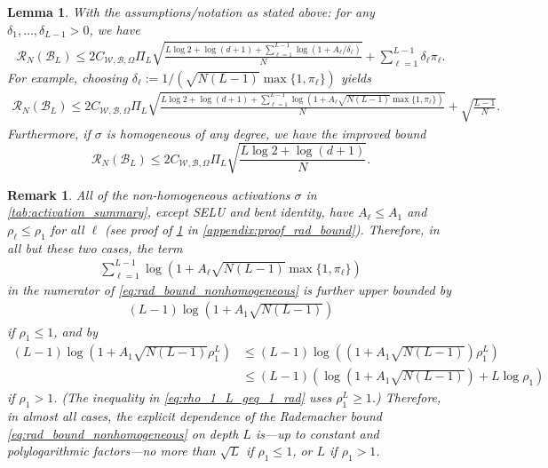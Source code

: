 \documentclass{article}
\def\cB{{\mathcal{B}}}
\def\cR{{\mathcal{R}}}
\def\cW{{\mathcal{W}}}
\newtheorem{lemma}[theorem]{Lemma}
\newtheorem{remark}[theorem]{Remark}
\begin{document}
\begin{lemma} \label{lemma:rad_bound}
    With the assumptions/notation as stated above: for any $\delta_1, \dots, \delta_{L-1} > 0$, we have
    \begin{align} \label{eq:rad_bound_nonhomogeneous_delta}
        \cR_N(\cB_L) \leq 2 C_{\cW, \cB,\Omega} \Pi_L \sqrt{\frac{L \log 2 + \log(d+1) + \sum_{\ell=1}^{L-1} \log (1+A_\ell/\delta_\ell)}{N}} + \sum_{\ell=1}^{L-1} \delta_{\ell} \pi_\ell.
    \end{align}
    For example, choosing $\delta_\ell := 1/(\sqrt{N(L-1)} \max\{1,\pi_\ell\})$ yields 
    \begin{align} \label{eq:rad_bound_nonhomogeneous}
        \cR_N(\cB_L) \leq 2 C_{\cW, \cB,\Omega} \Pi_L \sqrt{\frac{L \log 2 + \log(d+1) + \sum_{\ell=1}^{L-1} \log (1+ A_\ell \sqrt{N(L-1)} \max\{1, \pi_\ell\} )}{N}} + \sqrt{\frac{L-1}{N}}.
    \end{align}
    Furthermore, if $\sigma$ is homogeneous of any degree, we have the improved bound
    \begin{equation} \label{eq:rad_bound_homogeneous}
        \cR_N(\cB_L) \leq 2 C_{\cW, \cB, \Omega} \Pi_L \sqrt{\frac{L \log 2 + \log(d+1)}{N}}.
    \end{equation}
\end{lemma}
\begin{remark} \label{remark:rad_bound_A_rho}
    All of the non-homogeneous activations $\sigma$ in \cref{tab:activation_summary}, except SELU and bent identity, have $A_\ell \leq A_1$ and $\rho_\ell \leq \rho_1$ for all $\ell$ (see proof of \cref{lemma:rad_bound} in \cref{appendix:proof_rad_bound}). Therefore, in all but these two cases, the term
    \begin{align}
        \sum_{\ell=1}^{L-1} \log (1+A_\ell \sqrt{N(L-1)} \max\{ 1, \pi_\ell \})
    \end{align}
    in the numerator of \eqref{eq:rad_bound_nonhomogeneous} is further upper bounded by
    \begin{align} 
        (L-1) \log (1 + A_1 \sqrt{N(L-1)})
    \end{align}
    if $\rho_1 \leq 1$, and by
    \begin{align} 
        (L-1) \log (1 + A_1 \sqrt{N(L-1)} \rho_1^L ) &\leq (L-1) \log \left( \left(1 + A_1 \sqrt{N(L-1)} \right) \rho_1^L \right) \label{eq:rho_1_L_geq_1_rad} \\
        &\leq (L-1) \left( \log \left(1 + A_1 \sqrt{N(L-1)} \right) + L \log \rho_1 \right)
    \end{align}
    if $\rho_1 > 1$. (The inequality in \eqref{eq:rho_1_L_geq_1_rad} uses $\rho_1^L \geq 1$.) Therefore, in almost all cases, the explicit dependence of the Rademacher bound \eqref{eq:rad_bound_nonhomogeneous} on depth $L$ is---up to constant and polylogarithmic factors---no more than $\sqrt{L}$ if $\rho_1 \leq 1$,  or $L$ if $\rho_1 > 1$.
\end{remark}
\end{document}
